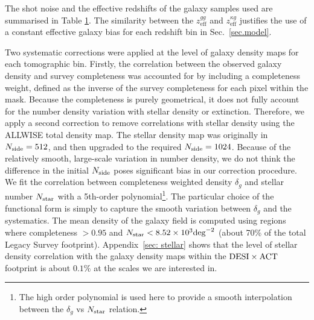 \documentclass[twocolumn]{aastex631}
\newcommand{\Ellen}[1]{\textcolor{orange}{(QH: #1)}}
\newcommand{\GSF}[1]{\textcolor{green}{(GSF: #1)}}
\begin{document}
{\begin{table}
\begin{tabular}{c ccccccc }
    \end{tabular}
    \label{tab:sample_summary}
\end{table}

The shot noise
and the effective redshifts of the galaxy samples used are summarised in Table \ref{tab:sample_summary}. The similarity between the $z^{gg}_\mathrm{eff}$ and $z^{\kappa{g}}_\mathrm{eff}$ justifies the use of a constant effective galaxy bias for each redshift bin in Sec.~\ref{sec.model}.

Two systematic corrections were applied at the level of galaxy density maps for each tomographic bin. Firstly, the correlation between the observed galaxy density and survey completeness was accounted for by including a completeness weight, defined as the inverse of the survey completeness for each pixel within the mask. 
Because the completeness is purely geometrical, it does not fully account for the number density variation with stellar density or extinction. Therefore, we apply a second correction to remove correlations with stellar density using the ALLWISE total density map. 
{The stellar density map was originally in $N_{\rm side}=512$, and then upgraded to the required $N_{\rm side}=1024$. Because of the relatively smooth, large-scale variation in number density, we do not think the difference in the initial $N_{\rm side}$ poses significant bias in our correction procedure. We fit the correlation between completeness weighted density $\delta_g$ and stellar number $N_{\rm star}$ with a 5th-order polynomial\footnote{{The high order polynomial is used here to provide a smooth interpolation between the $\delta_g$ vs $N_{\rm star}$ relation.}}. 
The particular choice of the functional form is simply to capture the smooth variation between $\delta_g$ and the systematics. 
The mean density of the galaxy field is computed using regions where completeness $>0.95$ and $N_{\rm star}<8.52\times10^3 {\rm deg}^{-2}$ (about 70\% of the total Legacy Survey footprint). Appendix~\ref{sec: stellar} shows that the level of stellar density correlation with the galaxy density maps within the ${\rm DESI}\times{\rm ACT}$ footprint is about $0.1\%$ at the scales we are interested in.} 
}
\end{document}
